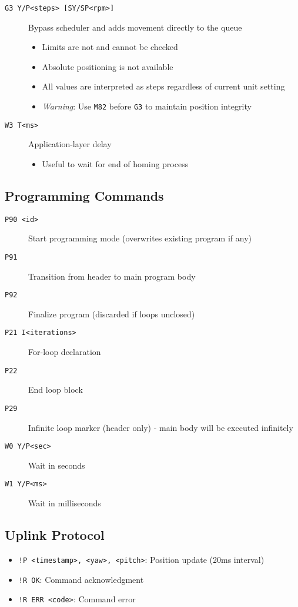 \begin{description}
  \item[\texttt{G3 Y/P<steps> [SY/SP<rpm>]}] Bypass scheduler and adds movement directly to the queue
    \begin{itemize}
      \item Limits are not and cannot be checked
      \item Absolute positioning is not available
      \item All values are interpreted as steps regardless of current unit setting
      \item \textit{Warning}: Use \texttt{M82} before \texttt{G3} to maintain position integrity
    \end{itemize}
  \item[\texttt{W3 T<ms>}] Application-layer delay
    \begin{itemize}
      \item Useful to wait for end of homing process
    \end{itemize}
\end{description}

\subsection*{Programming Commands}
\begin{description}
  \item[\texttt{P90 <id>}] Start programming mode (overwrites existing program if any)
  \item[\texttt{P91}] Transition from header to main program body
  \item[\texttt{P92}] Finalize program (discarded if loops unclosed)
  \item[\texttt{P21 I<iterations>}] For-loop declaration
  \item[\texttt{P22}] End loop block
  \item[\texttt{P29}] Infinite loop marker (header only) - main body will be executed infinitely
  \item[\texttt{W0 Y/P<sec>}] Wait in seconds
  \item[\texttt{W1 Y/P<ms>}] Wait in milliseconds
\end{description}


\subsection*{Uplink Protocol}

\begin{itemize}
  \item \texttt{!P <timestamp>, <yaw>, <pitch>}: Position update (20ms interval)
  \item \texttt{!R OK}: Command acknowledgment
  \item \texttt{!R ERR <code>}: Command error
\end{itemize}

